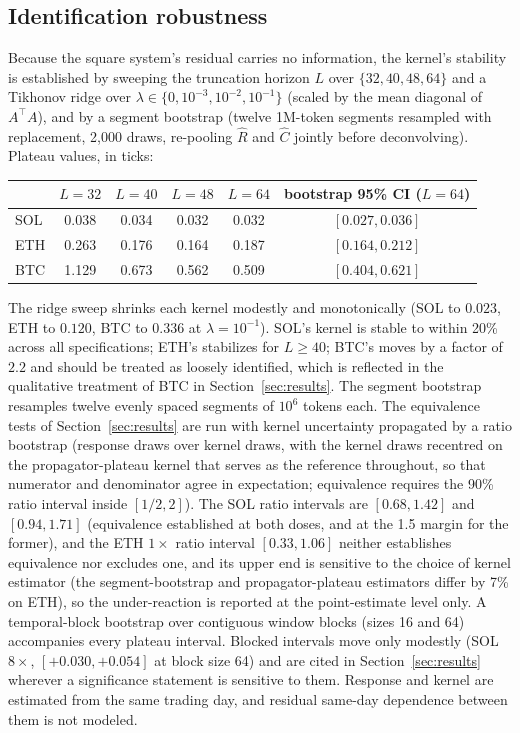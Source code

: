 \documentclass[11pt]{article}
\begin{document}
\subsection{Identification robustness}
\label{app:robust}

Because the square system's residual carries no information, the kernel's stability is established by sweeping the truncation horizon $L$ over $\{32, 40, 48, 64\}$ and a Tikhonov ridge over $\lambda \in \{0, 10^{-3}, 10^{-2}, 10^{-1}\}$ (scaled by the mean diagonal of $A^{\!\top}\!A$), and by a segment bootstrap (twelve 1M-token segments resampled with replacement, 2{,}000 draws, re-pooling $\hat R$ and $\hat C$ jointly before deconvolving). Plateau values, in ticks:

\begin{center}
\small
\begin{tabular}{lcccc c}
\toprule
 & $L=32$ & $L=40$ & $L=48$ & $L=64$ & bootstrap 95\% CI ($L=64$) \\
\midrule
SOL & 0.038 & 0.034 & 0.032 & 0.032 & $[0.027, 0.036]$ \\
ETH & 0.263 & 0.176 & 0.164 & 0.187 & $[0.164, 0.212]$ \\
BTC & 1.129 & 0.673 & 0.562 & 0.509 & $[0.404, 0.621]$ \\
\bottomrule
\end{tabular}
\end{center}

The ridge sweep shrinks each kernel modestly and monotonically (SOL to $0.023$, ETH to $0.120$, BTC to $0.336$ at $\lambda = 10^{-1}$). SOL's kernel is stable to within 20\% across all specifications; ETH's stabilizes for $L \ge 40$; BTC's moves by a factor of $2.2$ and should be treated as loosely identified, which is reflected in the qualitative treatment of BTC in Section~\ref{sec:results}. The segment bootstrap resamples twelve evenly spaced segments of $10^6$ tokens each. The equivalence tests of Section~\ref{sec:results} are run with kernel uncertainty propagated by a ratio bootstrap (response draws over kernel draws, with the kernel draws recentred on the propagator-plateau kernel that serves as the reference throughout, so that numerator and denominator agree in expectation; equivalence requires the 90\% ratio interval inside $[1/2, 2]$). The SOL ratio intervals are $[0.68, 1.42]$ and $[0.94, 1.71]$ (equivalence established at both doses, and at the 1.5 margin for the former), and the ETH $1\times$ ratio interval $[0.33, 1.06]$ neither establishes equivalence nor excludes one, and its upper end is sensitive to the choice of kernel estimator (the segment-bootstrap and propagator-plateau estimators differ by 7\% on ETH), so the under-reaction is reported at the point-estimate level only. A temporal-block bootstrap over contiguous window blocks (sizes 16 and 64) accompanies every plateau interval. Blocked intervals move only modestly (SOL $8\times$, $[+0.030, +0.054]$ at block size 64) and are cited in Section~\ref{sec:results} wherever a significance statement is sensitive to them. Response and kernel are estimated from the same trading day, and residual same-day dependence between them is not modeled.
\end{document}
